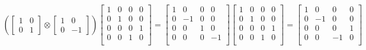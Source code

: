 \documentclass[12pt,a4paper]{article}
\begin{document}
\begin{equation*}
\begin{split}
    \left( \begin{bmatrix}
        1 & 0 \\
        0 & 1
    \end{bmatrix} \otimes \begin{bmatrix}
        1 & 0 \\
        0 & -1
    \end{bmatrix} \right) \begin{bmatrix}
        1 & 0 & 0 & 0\\
        0 & 1 & 0 & 0\\
        0 & 0 & 0 & 1\\
        0 & 0 & 1 & 0\\
        \end{bmatrix}  =\begin{bmatrix}
        1 & 0 & 0 & 0\\
        0 & -1 & 0 & 0\\
        0 & 0 & 1 & 0\\
        0 & 0 & 0 & -1\\
        \end{bmatrix}  \begin{bmatrix}
        1 & 0 & 0 & 0\\
        0 & 1 & 0 & 0\\
        0 & 0 & 0 & 1\\
        0 & 0 & 1 & 0\\
        \end{bmatrix}   
= \begin{bmatrix}
        1 & 0 & 0 & 0\\
        0 & -1 & 0 & 0\\
        0 & 0 & 0 & 1\\
        0 & 0 & -1 & 0\\
        \end{bmatrix}  
        \end{split}
\end{equation*}
\end{document}

